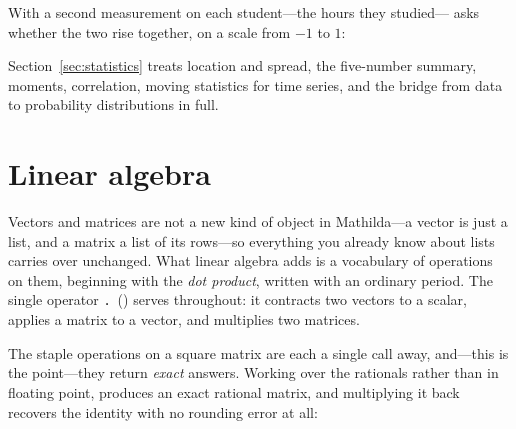 With a second measurement on each student---the hours they studied---
asks whether the two rise together, on a scale from $-1$ to $1$:

\begin{codepairs}
\end{codepairs}

Section~\ref{sec:statistics} treats location and spread, the five-number summary,
moments, correlation, moving statistics for time series, and the bridge from
data to probability distributions in full.

\section{Linear algebra}
\label{sec:intro-linalg}

Vectors and matrices are not a new kind of object in Mathilda---a
vector is just a list, and a matrix a list of its
rows---so everything you already know about lists carries over unchanged. What
linear algebra adds is a vocabulary of operations on them, beginning with the
\emph{dot product}, written with an ordinary period. The single
operator \texttt{.}\ () serves throughout: it contracts two vectors to a
scalar, applies a matrix to a vector, and multiplies two matrices.

\begin{codepairs}
\end{codepairs}

The staple operations on a square matrix are each a single call away, and---this is
the point---they return \emph{exact} answers. Working over the rationals rather than
in floating point,  produces an exact rational matrix, and multiplying it
back recovers the identity with no rounding error at all:

